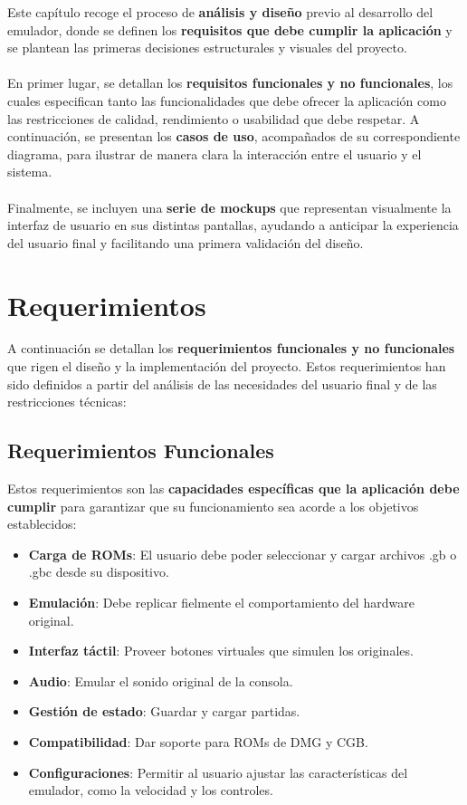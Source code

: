 Este capítulo recoge el proceso de \textbf{análisis y diseño} previo al desarrollo del emulador, donde se definen los \textbf{requisitos que debe cumplir la aplicación} y se plantean las primeras decisiones estructurales y visuales del proyecto.
\\\\
En primer lugar, se detallan los \textbf{requisitos funcionales y no funcionales}, los cuales especifican tanto las funcionalidades que debe ofrecer la aplicación como las restricciones de calidad, rendimiento o usabilidad que debe respetar. A continuación, se presentan los \textbf{casos de uso}, acompañados de su correspondiente diagrama, para ilustrar de manera clara la interacción entre el usuario y el sistema.
\\\\
Finalmente, se incluyen una \textbf{serie de mockups} que representan visualmente la interfaz de usuario en sus distintas pantallas, ayudando a anticipar la experiencia del usuario final y facilitando una primera validación del diseño.

\section{Requerimientos}

A continuación se detallan los \textbf{requerimientos funcionales y no funcionales} que rigen el diseño y la implementación del proyecto. Estos requerimientos han sido definidos a partir del análisis de las necesidades del usuario final y de las restricciones técnicas:

\subsection{Requerimientos Funcionales}

Estos requerimientos son las \textbf{capacidades específicas que la aplicación debe cumplir} para garantizar que su funcionamiento sea acorde a los objetivos establecidos:

\begin{itemize}
    \item \textbf{Carga de ROMs}: El usuario debe poder seleccionar y cargar archivos .gb o .gbc desde su dispositivo.
    \item \textbf{Emulación}: Debe replicar fielmente el comportamiento del hardware original.
    \item \textbf{Interfaz táctil}: Proveer botones virtuales que simulen los originales.
    \item \textbf{Audio}: Emular el sonido original de la consola.
    \item \textbf{Gestión de estado}: Guardar y cargar partidas.
    \item \textbf{Compatibilidad}: Dar soporte para ROMs de DMG y CGB.
    \item \textbf{Configuraciones}: Permitir al usuario ajustar las características del emulador, como la velocidad y los controles.
\end{itemize}

